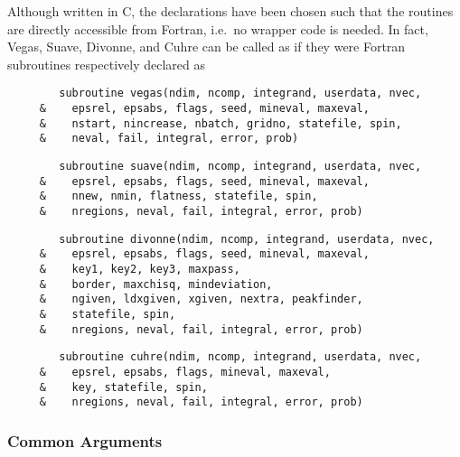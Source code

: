 \documentclass[12pt]{article}
\newcommand\ie{i.e.\ }
\begin{document}
Although written in C, the declarations have been chosen such that the
routines are directly accessible from Fortran, \ie no wrapper code is
needed.  In fact, Vegas, Suave, Divonne, and Cuhre can be called as if 
they were Fortran subroutines respectively declared as
\begin{verbatim}
        subroutine vegas(ndim, ncomp, integrand, userdata, nvec,
     &    epsrel, epsabs, flags, seed, mineval, maxeval,
     &    nstart, nincrease, nbatch, gridno, statefile, spin,
     &    neval, fail, integral, error, prob)
\end{verbatim}
\begin{verbatim}
        subroutine suave(ndim, ncomp, integrand, userdata, nvec,
     &    epsrel, epsabs, flags, seed, mineval, maxeval,
     &    nnew, nmin, flatness, statefile, spin,
     &    nregions, neval, fail, integral, error, prob)
\end{verbatim}
\begin{verbatim}
        subroutine divonne(ndim, ncomp, integrand, userdata, nvec,
     &    epsrel, epsabs, flags, seed, mineval, maxeval,
     &    key1, key2, key3, maxpass,
     &    border, maxchisq, mindeviation,
     &    ngiven, ldxgiven, xgiven, nextra, peakfinder,
     &    statefile, spin,
     &    nregions, neval, fail, integral, error, prob)
\end{verbatim}
\begin{verbatim}
        subroutine cuhre(ndim, ncomp, integrand, userdata, nvec,
     &    epsrel, epsabs, flags, mineval, maxeval,
     &    key, statefile, spin,
     &    nregions, neval, fail, integral, error, prob)
\end{verbatim}


\subsubsection{Common Arguments}
\label{sect:commonargs}
\end{document}
